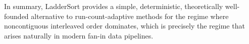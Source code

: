 \documentclass[12pt,a4paper]{article}
\theoremstyle{plain}
\theoremstyle{definition}
\begin{document}
In summary, LadderSort provides a simple, deterministic, theoretically
well-founded alternative to run-count-adaptive methods for the regime where
noncontiguous interleaved order dominates, which is precisely the regime that arises
naturally in modern fan-in data pipelines.



\end{document}
